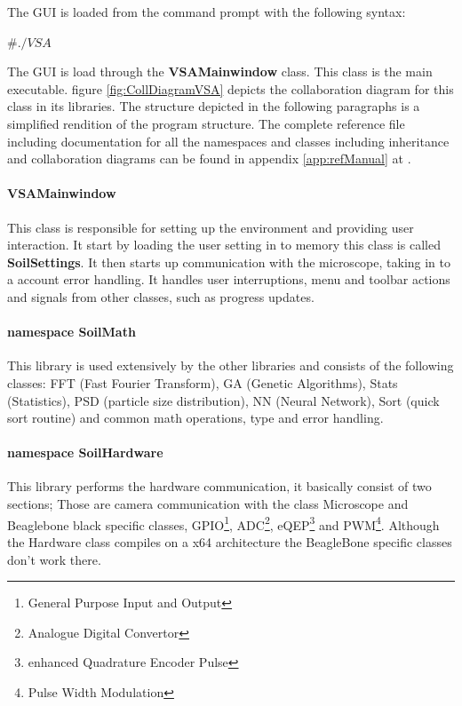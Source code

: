 \documentclass[11pt,fleqn,,a4paper,twoside,openright]{book}
\begin{document}
The GUI is loaded from the command prompt with the following syntax:
\begin{sBox}
	$\# ./VSA $
\end{sBox}

The GUI is load through the \textbf{VSAMainwindow} class. This class is the main executable. figure \ref{fig:CollDiagramVSA} depicts the collaboration diagram for this class in its libraries. The structure depicted in the following paragraphs is a simplified rendition of the program structure. The complete reference file including documentation for all the namespaces and classes including inheritance and collaboration diagrams can be found in appendix \ref{app:refManual} at \pageref{app:refManual}.

\paragraph{VSAMainwindow}
This class is responsible for setting up the environment and providing user interaction. It start by loading the user setting in to memory this class is called \textbf{SoilSettings}. It then starts up communication with the microscope, taking in to a account error handling. It handles user interruptions, menu and toolbar actions and signals from other classes, such as progress updates.

\paragraph{namespace SoilMath}
This library is used extensively by the other libraries and consists of the following classes: FFT (Fast Fourier Transform), GA (Genetic Algorithms), Stats (Statistics), PSD (particle size distribution), NN (Neural Network), Sort (quick sort routine) and common math operations, type and error handling.

\paragraph{namespace SoilHardware}
This library performs the hardware communication, it basically consist of two sections; Those are camera communication with the class Microscope and Beaglebone black specific classes, GPIO\footnote{General Purpose Input and Output}, ADC\footnote{Analogue Digital Convertor}, eQEP\footnote{enhanced Quadrature Encoder Pulse} and PWM\footnote{Pulse Width Modulation}. Although the Hardware class compiles on a x64 architecture the BeagleBone specific classes don't work there.
\end{document}
